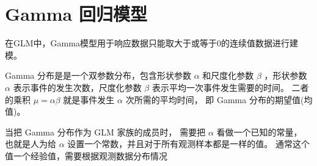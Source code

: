 \documentclass[letterpaper,10pt,english]{sphinxmanual}
\begin{document}
\section{Gamma 回归模型}
\label{\detokenize{gamma_u6a21_u578b/content:id3}}
在GLM中，Gamma模型用于响应数据只能取大于或等于0的连续值数据进行建模。

Gamma 分布是是一个双参数分布，包含形状参数 \(\alpha\) 和尺度化参数 \(\beta\)
，形状参数 \(\alpha\) 表示事件的发生次数，尺度化参数 \(\beta\) 表示平均一次事件发生需要的时间。
二者的乘积 \(\mu=\alpha \beta\) 就是事件发生  \(\alpha\) 次所需的平均时间，
即 Gamma 分布的期望值(均值)。

当把 Gamma 分布作为 GLM 家族的成员时，
需要把 \(\alpha\) 看做一个已知的常量，
也就是人为给 \(\alpha\) 设置一个常数，并且对于所有观测样本都是一样的值。
通常这个值一个经验值，需要根据观测数据分布情况
\end{document}
